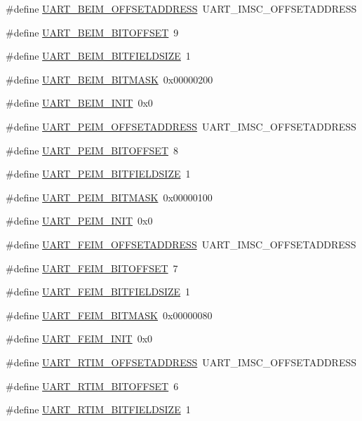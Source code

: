 \begin{DoxyCompactItemize}
\item 
\#define \hyperlink{a00575_a119295c6a08a5cf192290fa1c84b8647}{UART\_\-BEIM\_\-OFFSETADDRESS}~UART\_\-IMSC\_\-OFFSETADDRESS
\item 
\#define \hyperlink{a00575_ad494f4a3befc5ab1620393c8a0eb557f}{UART\_\-BEIM\_\-BITOFFSET}~9
\item 
\#define \hyperlink{a00575_a5859af68ecc75ca1352e67a418b97efc}{UART\_\-BEIM\_\-BITFIELDSIZE}~1
\item 
\#define \hyperlink{a00575_ad1abfd46de6077edefa3d9115c179e46}{UART\_\-BEIM\_\-BITMASK}~0x00000200
\item 
\#define \hyperlink{a00575_a0d8fc4f45d9d6b428d36ea363432e84b}{UART\_\-BEIM\_\-INIT}~0x0
\item 
\#define \hyperlink{a00575_a5aad26db88b1c2344c145e709b57bcc1}{UART\_\-PEIM\_\-OFFSETADDRESS}~UART\_\-IMSC\_\-OFFSETADDRESS
\item 
\#define \hyperlink{a00575_abad339bf5195301abf45333dbbb9744b}{UART\_\-PEIM\_\-BITOFFSET}~8
\item 
\#define \hyperlink{a00575_a05e450b0c50af4185d372d75fb40b82b}{UART\_\-PEIM\_\-BITFIELDSIZE}~1
\item 
\#define \hyperlink{a00575_a1ff7f619049fb658091eede9f254e581}{UART\_\-PEIM\_\-BITMASK}~0x00000100
\item 
\#define \hyperlink{a00575_ab691f12bfd371bdb909285742c7cafb7}{UART\_\-PEIM\_\-INIT}~0x0
\item 
\#define \hyperlink{a00575_ab1cac746b568e7e38c1abc2caab28616}{UART\_\-FEIM\_\-OFFSETADDRESS}~UART\_\-IMSC\_\-OFFSETADDRESS
\item 
\#define \hyperlink{a00575_a66a45567b814dec7621bb268c7d6e59b}{UART\_\-FEIM\_\-BITOFFSET}~7
\item 
\#define \hyperlink{a00575_a45bee7008e5efe35dcc8637782a131e9}{UART\_\-FEIM\_\-BITFIELDSIZE}~1
\item 
\#define \hyperlink{a00575_a8b9e57ccd9226dea5ef17a9ebd69df6b}{UART\_\-FEIM\_\-BITMASK}~0x00000080
\item 
\#define \hyperlink{a00575_af8be0d9f50ab0a0212688dadef31a331}{UART\_\-FEIM\_\-INIT}~0x0
\item 
\#define \hyperlink{a00575_aef357ab0ad33abae1591bd742945629d}{UART\_\-RTIM\_\-OFFSETADDRESS}~UART\_\-IMSC\_\-OFFSETADDRESS
\item 
\#define \hyperlink{a00575_a5c88290c46da01e3ffc069cb2b084ae7}{UART\_\-RTIM\_\-BITOFFSET}~6
\item 
\#define \hyperlink{a00575_add62d107268647a8a9f81223c6c6ba9f}{UART\_\-RTIM\_\-BITFIELDSIZE}~1

\end{DoxyCompactItemize}
